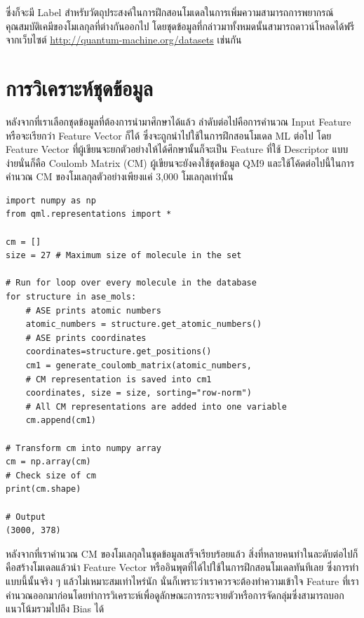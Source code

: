 \noindent ซึ่งก็จะมี Label สำหรับวัตถุประสงค์ในการฝึกสอนโมเดลในการเพิ่มความสามารถการพยากรณ์คุณสมบัติเคมีของโมเลกุลที่ต่างกันออกไป 
โดยชุดข้อมูลที่กล่าวมาทั้งหมดนั้นสามารถดาวน์โหลดได้ฟรีจากเว็บไซต์ \url{http://quantum-machine.org/datasets} เช่นกัน

\section{การวิเคราะห์ชุดข้อมูล}
\label{sec:dataset_analysis}

หลังจากที่เราเลือกชุดข้อมูลที่ต้องการนำมาศึกษาได้แล้ว ลำดับต่อไปคือการคำนวณ Input Feature หรือจะเรียกว่า Feature Vector ก็ได้
ซึ่งจะถูกนำไปใช้ในการฝึกสอนโมเดล ML ต่อไป โดย Feature Vector ที่ผู้เขียนจะยกตัวอย่างให้ได้ศึกษานั้นก็จะเป็น Feature ที่ใช้ Descriptor 
แบบง่ายนั่นก็คือ Coulomb Matrix (CM) ผู้เขียนจะยังคงใช้ชุดข้อมูล QM9 และใช้โค้ดต่อไปนี้ในการคำนวณ CM ของโมเลกุลตัวอย่างเพียงแค่ 3,000 
โมเลกุลเท่านั้น

\begin{lstlisting}[style=MyPython]
import numpy as np
from qml.representations import * 

cm = []
size = 27 # Maximum size of molecule in the set

# Run for loop over every molecule in the database
for structure in ase_mols: 
    # ASE prints atomic numbers 
    atomic_numbers = structure.get_atomic_numbers() 
    # ASE prints coordinates
    coordinates=structure.get_positions() 
    cm1 = generate_coulomb_matrix(atomic_numbers,
    # CM representation is saved into cm1
    coordinates, size = size, sorting="row-norm") 
    # All CM representations are added into one variable
    cm.append(cm1) 

# Transform cm into numpy array
cm = np.array(cm) 
# Check size of cm
print(cm.shape)

# Output
(3000, 378)
\end{lstlisting}

หลังจากที่เราคำนวณ CM ของโมเลกุลในชุดข้อมูลเสร็จเรียบร้อยแล้ว สิ่งที่หลายคนทำในละดับต่อไปก็คือสร้างโมเดลแล้วนำ Feature Vector 
หรืออินพุตที่ได้ไปใช้ในการฝึกสอนโมเดลทันทีเลย ซึ่งการทำแบบนี้นั้นจริง ๆ แล้วไม่เหมาะสมเท่าไหร่นัก นั่นก็เพราะว่าเราควรจะต้องทำความเข้าใจ 
Feature ที่เราคำนวณออกมาก่อนโดยทำการวิเคราะห์เพื่อดูลักษณะการกระจายตัวหรือการจัดกลุ่มซึ่งสามารถบอกแนวโน้มรวมไปถึง Bias ได้

